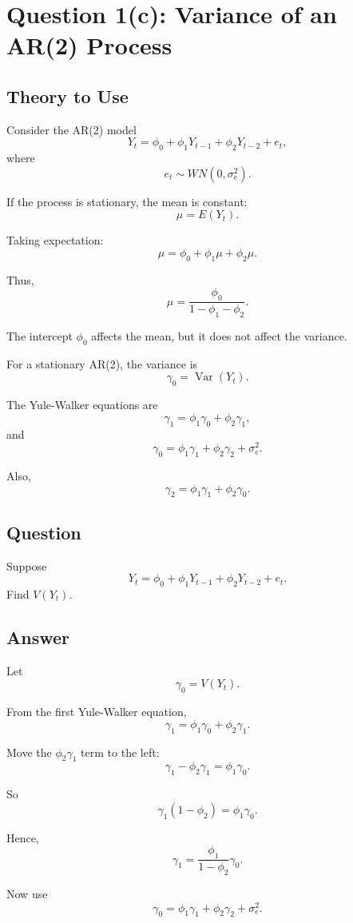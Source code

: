 \documentclass[12pt]{article}
\begin{document}
\section*{Question 1(c): Variance of an AR(2) Process}

\subsection*{Theory to Use}

Consider the AR(2) model
\[
Y_t = \phi_0+\phi_1Y_{t-1}+\phi_2Y_{t-2}+e_t,
\]
where
\[
e_t \sim WN(0,\sigma_e^2).
\]

If the process is stationary, the mean is constant:
\[
\mu = E(Y_t).
\]

Taking expectation:
\[
\mu=\phi_0+\phi_1\mu+\phi_2\mu.
\]

Thus,
\[
\mu = \frac{\phi_0}{1-\phi_1-\phi_2}.
\]

The intercept \(\phi_0\) affects the mean, but it does not affect the variance.

For a stationary AR(2), the variance is
\[
\gamma_0 = \operatorname{Var}(Y_t).
\]

The Yule-Walker equations are
\[
\gamma_1 = \phi_1\gamma_0+\phi_2\gamma_1,
\]
and
\[
\gamma_0 = \phi_1\gamma_1+\phi_2\gamma_2+\sigma_e^2.
\]

Also,
\[
\gamma_2 = \phi_1\gamma_1+\phi_2\gamma_0.
\]

\subsection*{Question}

Suppose
\[
Y_t = \phi_0+\phi_1Y_{t-1}+\phi_2Y_{t-2}+e_t.
\]
Find \(V(Y_t)\).

\subsection*{Answer}

Let
\[
\gamma_0 = V(Y_t).
\]

From the first Yule-Walker equation,
\[
\gamma_1 = \phi_1\gamma_0+\phi_2\gamma_1.
\]

Move the \(\phi_2\gamma_1\) term to the left:
\[
\gamma_1-\phi_2\gamma_1=\phi_1\gamma_0.
\]

So
\[
\gamma_1(1-\phi_2)=\phi_1\gamma_0.
\]

Hence,
\[
\gamma_1=\frac{\phi_1}{1-\phi_2}\gamma_0.
\]

Now use
\[
\gamma_0=\phi_1\gamma_1+\phi_2\gamma_2+\sigma_e^2.
\]
\end{document}
